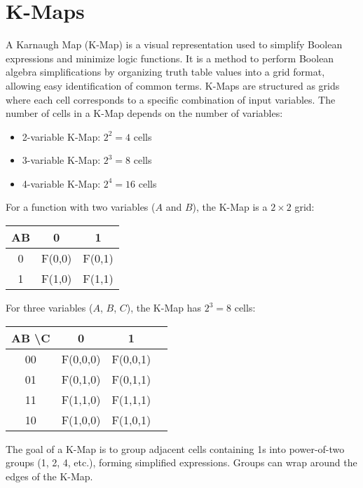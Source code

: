 \section{K-Maps}

A Karnaugh Map (K-Map) is a visual representation used to simplify Boolean expressions and minimize logic functions. It is a method to perform Boolean algebra simplifications by organizing truth table values into a grid format, allowing easy identification of common terms.
K-Maps are structured as grids where each cell corresponds to a specific combination of input variables. The number of cells in a K-Map depends on the number of variables:

\begin{itemize}
    \item 2-variable K-Map: $2^2 = 4$ cells
    \item 3-variable K-Map: $2^3 = 8$ cells
    \item 4-variable K-Map: $2^4 = 16$ cells
\end{itemize}

For a function with two variables ($A$ and $B$), the K-Map is a $2 \times 2$ grid:

\begin{center}
    \begin{tabular}{|c|c|c|}
        \hline
        AB & 0      & 1      \\
        \hline
        0  & F(0,0) & F(0,1) \\
        \hline
        1  & F(1,0) & F(1,1) \\
        \hline
    \end{tabular}
\end{center}

For three variables ($A$, $B$, $C$), the K-Map has $2^3 = 8$ cells:

\begin{center}
    \begin{tabular}{|c|c|c|c|}
        \hline
        AB \textbackslash C & 0        & 1        \\
        \hline
        00                  & F(0,0,0) & F(0,0,1) \\
        \hline
        01                  & F(0,1,0) & F(0,1,1) \\
        \hline
        11                  & F(1,1,0) & F(1,1,1) \\
        \hline
        10                  & F(1,0,0) & F(1,0,1) \\
        \hline
    \end{tabular}
\end{center}

The goal of a K-Map is to group adjacent cells containing 1s into power-of-two groups (1, 2, 4, etc.), forming simplified expressions. Groups can wrap around the edges of the K-Map.



